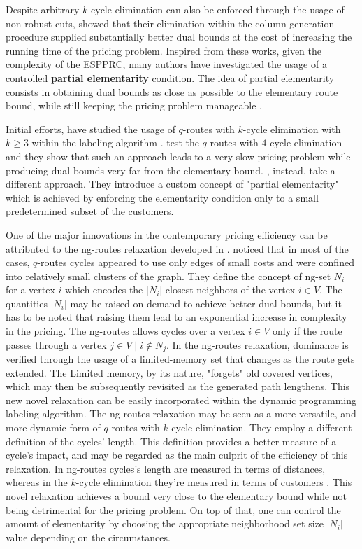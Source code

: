 \medskip

Despite arbitrary $k$-cycle elimination can also
be enforced through the usage of non-robust cuts,
\citeauthor{feillet2004} showed that their elimination
within the column generation procedure supplied
substantially better dual bounds at the cost
of increasing the running time of the pricing problem.
Inspired from these works, given the complexity
of the ESPPRC, many authors have investigated the usage
of a controlled \textbf{partial elementarity} condition.
The idea of partial elementarity consists in obtaining
dual bounds as close as possible to the elementary route bound,
while still keeping the pricing problem manageable \parencite{contardo2015}.

Initial efforts, have studied the usage of $q$-routes with
$k$-cycle elimination with $k \ge 3$ within the labeling algorithm \parencite{irnich2006, fukasawa2006}.
\textcite{fukasawa2006} test the $q$-routes with $4$-cycle elimination
and they show that such an approach leads
to a very slow pricing problem while
producing dual bounds very far from the elementary bound.
\textcite{desaulniers2008}, instead, take a different approach.
They introduce a custom concept of "partial elementarity"
which is achieved by enforcing the elementarity condition
only to a small predetermined subset of the customers.

One of the major innovations in the contemporary pricing efficiency
can be attributed to the ng-routes relaxation developed in \textcite{baldacci2011}.
\citeauthor{baldacci2011} noticed that in most of the cases,
$q$-routes cycles appeared to use only edges of small costs
and were confined into relatively small clusters of the graph.
They define the concept of ng-set $N_i$ for a vertex $i$
which encodes the $|N_i|$ closest neighbors of the vertex $i \in V$.
The quantities $|N_i|$ may be raised on demand to achieve better dual bounds,
but it has to be noted that raising them lead to an exponential increase in complexity
in the pricing.
The ng-routes allows cycles over a vertex $i \in V$ only if the route
passes through a vertex $j \in V \mid i \notin N_j$.
In the ng-routes relaxation,
dominance is verified through the usage of a limited-memory set
that changes as the route gets extended.
The Limited memory, by its nature,
"forgets" old covered vertices,
which may then be subsequently revisited
as the generated path lengthens.
This new novel relaxation can be easily incorporated within the
dynamic programming labeling algorithm.
The ng-routes relaxation may be seen
as a more versatile, and more dynamic form of $q$-routes
with $k$-cycle elimination.
They employ a different definition of the cycles' length.
This definition provides a better measure of a cycle's impact,
and may be regarded as the main culprit of the efficiency of
this relaxation.
In ng-routes cycles's length are measured in terms of distances,
whereas in the $k$-cycle elimination they're measured
in terms of customers \parencite{contardo2014}.
This novel relaxation achieves a bound very close to the elementary bound while
not being detrimental for the pricing problem.
On top of that, one can control
the amount of elementarity by choosing the appropriate neighborhood set size $|N_i|$
value  depending on the circumstances.


